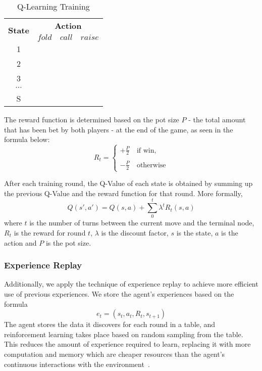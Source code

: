 \documentclass{article}
\begin{document}
\begin{table}[h!]
  \begin{center}
	\begin{tabular}{ c|c|c|c }
	\hline
	\multirow{2}{*}{\textbf{State}}&\multicolumn{3}{|c}{\textbf{Action}}\\
	\cline{2-4}
	& $fold$ & $call$ & $raise$\\ 
	\hline
	1\\
	2\\ 
	3\\ 
	$\cdots$\\
	S\\
	\hline
	\end{tabular}
	\caption{Q-Learning Training}
    \label{tab:table1}
  \end{center}
\end{table}
The reward function is determined based on the pot size $P$ - the total amount that has been bet by both players - at the end of the game, as seen in the formula below:
\begin{displaymath}
  R_t=
  \left\lbrace
  \begin{array}{l}
    +\frac{P}{2}\quad\text{if win,} \\
    \\
    -\frac{P}{2}\quad\text{otherwise}
  \end{array}
  \right.
\end{displaymath}

After each training round, the Q-Value of each state is obtained by summing up the previous Q-Value and the reward function for that round. More formally,
\begin{displaymath}
Q\left(s',a'\right)=Q\left(s,a\right)+\sum_{0}^{t}\lambda^{t}R_t\left(s,a\right)
\end{displaymath}
\noindent where $t$ is the number of turns between the current move and the terminal node, $R_t$ is the reward for round $t$, $\lambda$ is the discount factor, $s$ is the state, $a$ is the action and $P$ is the pot size.

\subsubsection{Experience Replay}

Additionally, we apply the technique of experience replay to achieve more efficient use of previous experiences. We store the agent's experiences based on the formula
\begin{displaymath}
e_t=\left(s_t,a_t,R_t,s_{t+1}\right)
\end{displaymath}
The agent stores the data it discovers for each round in a table, and reinforcement learning takes place based on random sampling from the table. This reduces the amount of experience required to learn, replacing it with more computation and memory which are cheaper resources than the agent's continuous interactions with the environment~\cite{sqas:replay}.
\end{document}
